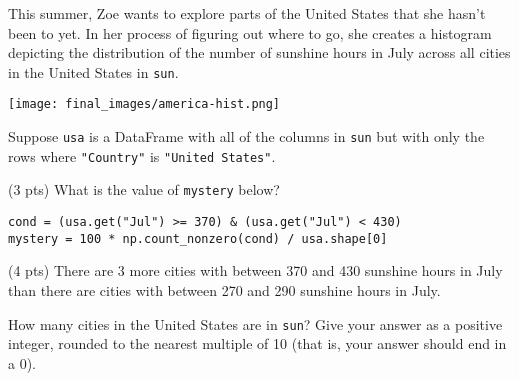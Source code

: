 \newpage

\begin{prob}[(13 pts)]

This summer, Zoe wants to explore parts of the United States that she hasn't been to yet. In her process of figuring out where to go, she creates a histogram depicting the distribution of the number of sunshine hours in July across all cities in the United States in \texttt{sun}.

\begin{center}
\texttt{[image: final\_images/america-hist.png]}
\end{center}

Suppose \texttt{usa} is a DataFrame with all of the columns in \texttt{sun} but with only the rows where \texttt{"Country"} is \texttt{"United States"}.


\begin{subprobset}

\begin{subprob}(3 pts) What is the value of \texttt{mystery} below?

\begin{verbatim}
cond = (usa.get("Jul") >= 370) & (usa.get("Jul") < 430)
mystery = 100 * np.count_nonzero(cond) / usa.shape[0]
\end{verbatim}

    
\end{subprob}


    

\begin{subprob}(4 pts) There are 3 more cities with between 370 and 430 sunshine hours in July than there are cities with between 270 and 290 sunshine hours in July.

How many cities in the United States are in \texttt{sun}? Give your answer as a positive integer, rounded to the nearest multiple of 10 (that is, your answer should end in a 0).


\end{subprob}
\end{subprobset}
\end{prob}
